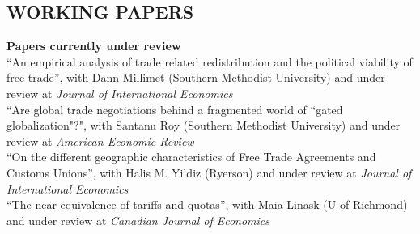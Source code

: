 \documentclass[11pt]{res}
\begin{document}
\begin{resume}
\section{WORKING PAPERS}\vspace{2mm}
{\bf Papers currently under review}\vspace{1.5mm}\\
{``An empirical analysis of trade related redistribution and the political viability of free trade''}, with Dann Millimet (Southern Methodist University) and under review at \emph{Journal of International Economics}\vspace{1.5mm}\\
{``Are global trade negotiations behind a fragmented world of ``gated globalization"?"}, with Santanu Roy (Southern Methodist University) and under review at \emph{American Economic Review}\vspace{1.5mm}\\
{``On the different geographic characteristics of Free Trade Agreements and Customs Unions''}, with Halis M. Yildiz (Ryerson) and under review at \emph{Journal of International Economics}\vspace{1.5mm}\\
{``The near-equivalence of tariffs and quotas''}, with Maia Linask (U of Richmond) and under review at \emph{Canadian Journal of Economics}\vspace{1.5mm}\\
\newpage
\phantom{.}\vspace{.4cm}


\end{resume}
\end{document}
